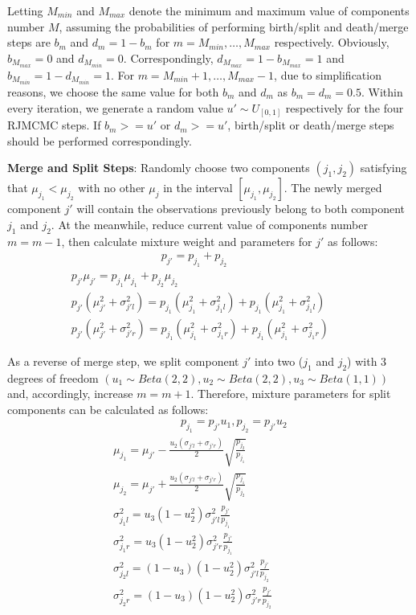 \documentclass[conference]{IEEEtran}
\begin{document}
Letting $M_{min}$ and $M_{max}$ denote the minimum and maximum value of components number $M$, assuming the probabilities of performing birth/split and death/merge steps are $b_m$ and $d_m = 1 - b_m$ for $m = M_{min},\dots,M_{max}$ respectively. Obviously, $b_{M_{max}}=0$ and $d_{M_{min}}=0$. Correspondingly, $d_{M_{max}}=1-b_{M_{max}} = 1$ and $b_{M_{min}}=1-d_{M_{min}}=1$. For $m=M_{min}+1,\dots,M_{max}-1$, due to simplification reasons, we choose the same value for both $b_m$ and $d_m$ as $b_m=d_m=0.5$. Within every iteration, we generate a random value $u' \sim U_{[0,1]}$ respectively for the four RJMCMC steps. If $b_m >= u'$ or $d_m >= u'$, birth/split or death/merge steps should be performed correspondingly.\cite{b1}

\textbf{Merge and Split Steps}: Randomly choose two components $(j_1,j_2)$ satisfying that $\mu_{j_1}<\mu_{j_2}$ with no other $\mu_j$ in the interval $[\mu_{j_1},\mu_{j_2}]$. The newly merged component $j'$ will contain the observations previously belong to both component $j_1$ and $j_2$. At the meanwhile, reduce current value of components number $m=m-1$, then calculate mixture weight and parameters for $j'$ as follows:
\begin{multline}
\qquad\qquad\qquad\qquad p_{j'} = p_{j_1}+p_{j_2} \\
p_{j'}\mu_{j'} = p_{j_1}\mu_{j_1} + p_{j_2}\mu_{j_2} \\
p_{j'}(\mu_{j'}^2 + \sigma_{j'l}^2) = p_{j_1}(\mu_{j_1}^2 + \sigma_{j_1l}^2)+p_{j_1}(\mu_{j_1}^2 + \sigma_{j_1l}^2) \qquad \\
p_{j'}(\mu_{j'}^2 + \sigma_{j'r}^2) = p_{j_1}(\mu_{j_1}^2 + \sigma_{j_1r}^2)+p_{j_1}(\mu_{j_1}^2 + \sigma_{j_1r}^2)
\label{eq:merge}
\end{multline}

As a reverse of merge step, we split component $j'$ into two ($j_1$ and $j_2$) with 3 degrees of freedom $(u_1 \sim Beta(2,2), u_2 \sim Beta(2,2), u_3 \sim Beta(1,1))$ and, accordingly, increase $m=m+1$. Therefore, mixture parameters for split components can be calculated as follows:
\begin{multline}
\qquad\qquad\qquad p_{j_1} = p_{j'}u_1, p_{j_2} = p_{j'}u_2 \\
\mu_{j_1} = \mu_{j'} - \frac{u_2(\sigma_{j'l}+\sigma_{j'r})}{2} \sqrt{\frac{p_{j_2}}{p_{j_1}}} \\
\mu_{j_2} = \mu_{j'} + \frac{u_2(\sigma_{j'l}+\sigma_{j'r})}{2} \sqrt{\frac{p_{j_1}}{p_{j_2}}} \\
\sigma_{j_1l}^2 = u_3(1-u_2^2)\sigma_{j'l}^2\frac{p_{j'}}{p_{j_1}} \\
\sigma_{j_1r}^2 = u_3(1-u_2^2)\sigma_{j'r}^2\frac{p_{j'}}{p_{j_1}} \\
\sigma_{j_2l}^2 = (1-u_3)(1-u_2^2)\sigma_{j'l}^2\frac{p_{j'}}{p_{j_2}} \\
\sigma_{j_2r}^2 = (1-u_3)(1-u_2^2)\sigma_{j'r}^2\frac{p_{j'}}{p_{j_2}} \qquad\quad
\label{eq:split}
\end{multline}
\end{document}
